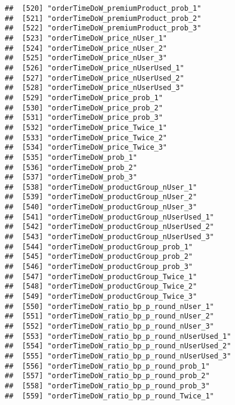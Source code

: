 \documentclass[10pt]{report}
\begin{document}
\begin{verbatim}
##  [520] "orderTimeDoW_premiumProduct_prob_1"                   
##  [521] "orderTimeDoW_premiumProduct_prob_2"                   
##  [522] "orderTimeDoW_premiumProduct_prob_3"                   
##  [523] "orderTimeDoW_price_nUser_1"                           
##  [524] "orderTimeDoW_price_nUser_2"                           
##  [525] "orderTimeDoW_price_nUser_3"                           
##  [526] "orderTimeDoW_price_nUserUsed_1"                       
##  [527] "orderTimeDoW_price_nUserUsed_2"                       
##  [528] "orderTimeDoW_price_nUserUsed_3"                       
##  [529] "orderTimeDoW_price_prob_1"                            
##  [530] "orderTimeDoW_price_prob_2"                            
##  [531] "orderTimeDoW_price_prob_3"                            
##  [532] "orderTimeDoW_price_Twice_1"                           
##  [533] "orderTimeDoW_price_Twice_2"                           
##  [534] "orderTimeDoW_price_Twice_3"                           
##  [535] "orderTimeDoW_prob_1"                                  
##  [536] "orderTimeDoW_prob_2"                                  
##  [537] "orderTimeDoW_prob_3"                                  
##  [538] "orderTimeDoW_productGroup_nUser_1"                    
##  [539] "orderTimeDoW_productGroup_nUser_2"                    
##  [540] "orderTimeDoW_productGroup_nUser_3"                    
##  [541] "orderTimeDoW_productGroup_nUserUsed_1"                
##  [542] "orderTimeDoW_productGroup_nUserUsed_2"                
##  [543] "orderTimeDoW_productGroup_nUserUsed_3"                
##  [544] "orderTimeDoW_productGroup_prob_1"                     
##  [545] "orderTimeDoW_productGroup_prob_2"                     
##  [546] "orderTimeDoW_productGroup_prob_3"                     
##  [547] "orderTimeDoW_productGroup_Twice_1"                    
##  [548] "orderTimeDoW_productGroup_Twice_2"                    
##  [549] "orderTimeDoW_productGroup_Twice_3"                    
##  [550] "orderTimeDoW_ratio_bp_p_round_nUser_1"                
##  [551] "orderTimeDoW_ratio_bp_p_round_nUser_2"                
##  [552] "orderTimeDoW_ratio_bp_p_round_nUser_3"                
##  [553] "orderTimeDoW_ratio_bp_p_round_nUserUsed_1"            
##  [554] "orderTimeDoW_ratio_bp_p_round_nUserUsed_2"            
##  [555] "orderTimeDoW_ratio_bp_p_round_nUserUsed_3"            
##  [556] "orderTimeDoW_ratio_bp_p_round_prob_1"                 
##  [557] "orderTimeDoW_ratio_bp_p_round_prob_2"                 
##  [558] "orderTimeDoW_ratio_bp_p_round_prob_3"                 
##  [559] "orderTimeDoW_ratio_bp_p_round_Twice_1"                

\end{verbatim}
\end{document}
